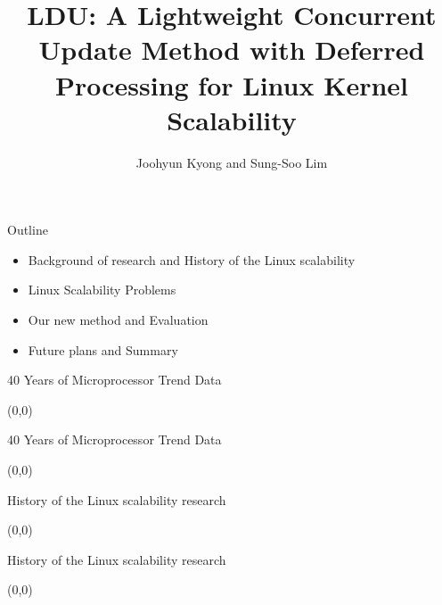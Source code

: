 \documentclass[english]{beamer} %
\begin{document}
\title[Memory Scalability]{
LDU: A Lightweight Concurrent Update Method with Deferred Processing for Linux
Kernel Scalability
}

\author{Joohyun Kyong and Sung-Soo Lim}


\begin{frame}
  \titlepage
\end{frame}

\begin{frame}{Outline}
	\begin{itemize}
	\item Background of research and History of the Linux scalability 
	\item Linux Scalability Problems
	\item Our new method and Evaluation
	\item Future plans and Summary
	\end{itemize}
\end{frame}

\begin{frame}{40 Years of Microprocessor Trend Data}
\begin{textblock}{1}(0,0)
\end{textblock}
\end{frame}

\begin{frame}{40 Years of Microprocessor Trend Data}
\begin{textblock}{1}(0,0)
\end{textblock}
\end{frame}

\begin{frame}{History of the Linux scalability research}
\begin{textblock}{1}(0,0)
\end{textblock}
\end{frame}

\begin{frame}{History of the Linux scalability research}
\begin{textblock}{1}(0,0)
\end{textblock}
\end{frame}
\end{document}
